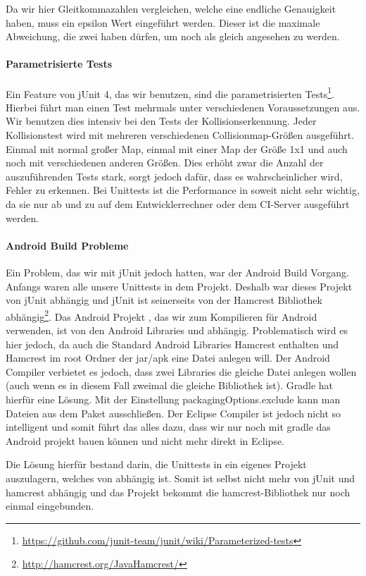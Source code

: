 Da wir hier Gleitkommazahlen vergleichen, welche eine endliche Genauigkeit haben, muss ein epsilon Wert eingeführt werden. Dieser ist die maximale Abweichung, die zwei  haben dürfen, um noch als gleich angesehen zu werden.

\paragraph{Parametrisierte Tests}

Ein Feature von jUnit 4, das wir benutzen, sind die parametrisierten Tests\footnote{\url{https://github.com/junit-team/junit/wiki/Parameterized-tests}}. 
Hierbei führt man einen Test mehrmals unter verschiedenen Voraussetzungen aus. 
Wir benutzen dies intensiv bei den Tests der Kollisionserkennung. 
Jeder Kollisionstest wird mit mehreren verschiedenen Collisionmap-Größen ausgeführt. 
Einmal mit normal großer Map, einmal mit einer Map der Größe 1x1 und auch noch mit verschiedenen anderen Größen. 
Dies erhöht zwar die Anzahl der auszuführenden Tests stark, sorgt jedoch dafür, dass es wahrscheinlicher wird, Fehler zu erkennen. Bei Unittests ist die Performance in soweit nicht sehr wichtig, da sie nur ab und zu auf dem Entwicklerrechner oder dem CI-Server ausgeführt werden.

\paragraph{Android Build Probleme}

Ein Problem, das wir mit jUnit jedoch hatten, war der Android Build Vorgang. 
Anfangs waren alle unsere Unittests in dem  Projekt. Deshalb war dieses Projekt von jUnit abhängig und jUnit ist seinerseits von der Hamcrest Bibliothek abhängig\footnote{\url{http://hamcrest.org/JavaHamcrest/}}. 
Das Android Projekt , das wir zum Kompilieren für Android verwenden, ist von den Android Libraries und  abhängig.
Problematisch wird es hier jedoch, da auch die Standard Android Libraries Hamcrest enthalten und Hamcrest im root Ordner der jar/apk eine Datei  anlegen will. Der Android Compiler verbietet es jedoch, dass zwei Libraries die gleiche Datei anlegen wollen (auch wenn es in diesem Fall zweimal die gleiche Bibliothek ist).
Gradle hat hierfür eine Lösung. Mit der Einstellung packagingOptions.exclude kann man Dateien aus dem Paket ausschließen. Der Eclipse Compiler ist jedoch nicht so intelligent und somit führt das alles dazu, dass wir nur noch mit gradle das Android projekt bauen können und nicht mehr direkt in Eclipse.

Die Lösung hierfür bestand darin, die Unittests in ein eigenes Projekt  auszulagern, welches von  abhängig ist. Somit ist  selbst nicht mehr von jUnit und hamcrest abhängig und das Projekt  bekommt die hamcrest-Bibliothek nur noch einmal eingebunden.
